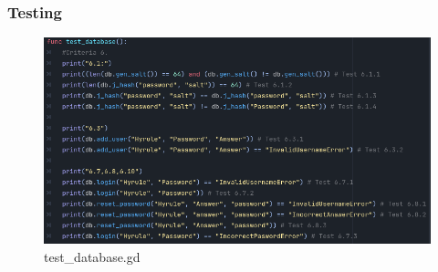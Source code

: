 \documentclass{article}
\begin{document}
        \subsubsection{Testing}
        \begin{figure}[H]
                \centering
                \includegraphics{images/development/test_database.PNG}
                \caption{test\_database.gd}
        \end{figure}
\end{document}
